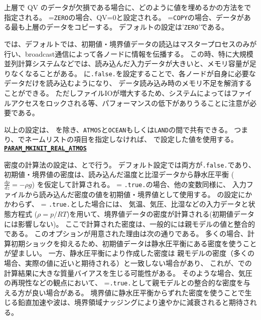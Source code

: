 上層で QV のデータが欠損である場合に、どのように値を埋めるかの方法をで指定される。
=\verb|ZERO|の場合、QV=0と設定される。
=\verb|COPY|の場合、データがある最も上層のデータをコピーする。
デフォルトの設定は'\verb|ZERO|'である。


\scalerm では、デフォルトでは、初期値・境界値データの読込はマスタープロセスのみが行い、broadcast通信によって各ノードに情報を伝播する。
この時、特に大規模並列計算システムなどでは、読み込んだ入力データが大きいと、メモリ容量が足りなくなることがある。
に\verb|.false.|を設定することで、各ノードが自身に必要なデータだけを読み込むようになり、
データ読み込み時のメモリ不足を解消することができる。
ただしファイルIOが増大するため、システムによってはファイルアクセスをロックされる等、パフォーマンスの低下がありうることに注意が必要である。


以上の設定は、 を除き、\verb|ATMOS|と\verb|OCEAN|もしくは\verb|LAND|の間で共有できる。
つまり、でネームリストの項目を指定しなければ、
で設定した値を使用する。
\\

\noindent\textbf{\underline{\texttt{PARAM\_MKINIT\_REAL\_ATMOS}}}

密度の計算法の設定は、とで行う。
デフォルト設定では両方が\verb|.false.|であり、
初期値・境界値の密度は、読み込んだ温度と比湿データから静水圧平衡 ($\frac{dp}{dz}=-\rho g$) を仮定して計算される。
 = \verb|.true.|の場合、他の変数同様に、
入力ファイルから読み込んだ密度の値を初期値・境界値として使用する。
の設定にかかわらず、 = \verb|.true.|とした場合には、
気温、気圧、比湿などの入力データと状態方程式 ($\rho = p/RT$)を用いて、境界値データの密度が計算される(初期値データには影響しない)。
ここで計算された密度は、一般的には親モデルの値と整合的である。
このオプションが用意された理由は次の通りである。
多くの場合、計算初期ショックを抑えるため、初期値データは静水圧平衡にある密度を使うことが望ましい。
一方、静水圧平衡により作成した密度は
親モデルの密度（多くの場合、実際の値に近いと期待される）と一致しない場合があり、
これが、\scalerm での計算結果に大きな質量バイアスを生じる可能性がある。
そのような場合、気圧の再現性などの観点において、
=\verb|.true.|として親モデルとの整合的な密度を与える方が良い場合がある。
境界値に静水圧平衡からずれた密度を使うことで生じる鉛直加速や波は、境界領域ナッジングにより速やかに減衰されると期待される。

